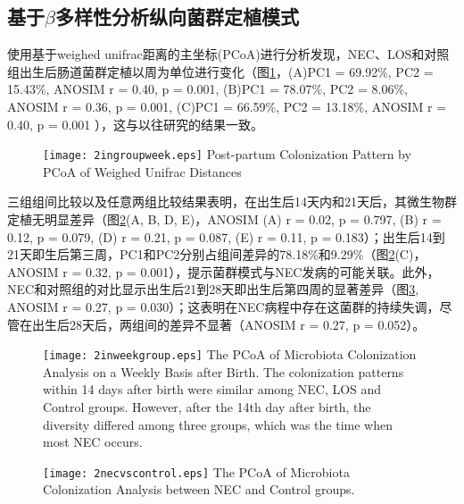 {{      \subsection{基于$\beta$多样性分析纵向菌群定植模式}
      使用基于weighed unifrac距离的主坐标(PCoA)进行分析发现，NEC、LOS和对照组出生后肠道菌群定植以周为单位进行变化（图\ref{fig:2ingroupweek}，(A)PC1 = 69.92\%, PC2 = 15.43\%, ANOSIM r = 0.40, p = 0.001, (B)PC1 = 78.07\%, PC2 = 8.06\%, ANOSIM r = 0.36, p = 0.001, (C)PC1 = 66.59\%, PC2 = 13.18\%, ANOSIM r = 0.40, p = 0.001 ），这与以往研究的结果一致\cite{moles2013bacterial}。
          \begin{figure}[!htp]
            \centering
            \texttt{[image: 2ingroupweek.eps]}
              {Post-partum Colonization Pattern by PCoA of Weighed Unifrac Distances}
            \label{fig:2ingroupweek}
          \end{figure}

      三组组间比较以及任意两组比较结果表明，在出生后14天内和21天后，其微生物群定植无明显差异（图\ref{fig:2inweekgroup}(A, B, D, E)，ANOSIM (A) r = 0.02, p = 0.797, (B) r = 0.12, p = 0.079, (D) r = 0.21, p = 0.087, (E) r = 0.11, p = 0.183）；出生后14到21天即生后第三周，PC1和PC2分别占组间差异的78.18\%和9.29\%（图\ref{fig:2inweekgroup}(C)，ANOSIM r = 0.32, p = 0.001），提示菌群模式与NEC发病的可能关联。此外，NEC和对照组的对比显示出生后21到28天即出生后第四周的显著差异（图\ref{fig:2necvscontrol}, ANOSIM r = 0.27, p = 0.030）；这表明在NEC病程中存在这菌群的持续失调，尽管在出生后28天后，两组间的差异不显著（ANOSIM r = 0.27, p = 0.052）。
          \begin{figure}[!htp]
            \centering
            \texttt{[image: 2inweekgroup.eps]}
              {The PCoA of Microbiota Colonization Analysis on a Weekly Basis after Birth. The colonization patterns within 14 days after birth were similar among NEC, LOS and Control groups. However, after the 14th day after birth, the diversity differed among three groups, which was the time when most NEC occurs. }
            \label{fig:2inweekgroup}
          \end{figure}
          \begin{figure}[!htp]
            \centering
            \texttt{[image: 2necvscontrol.eps]}
              {The PCoA of Microbiota Colonization Analysis between NEC and Control groups.}
            \label{fig:2necvscontrol}
          \end{figure}

}}
